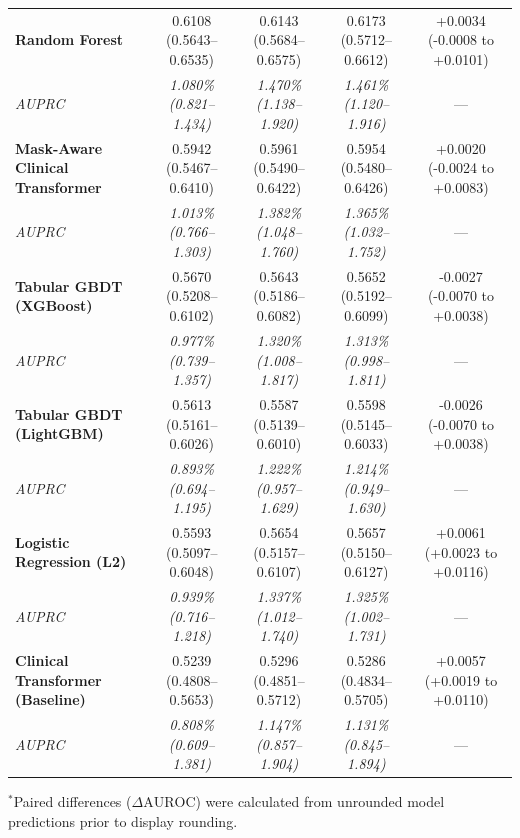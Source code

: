 \documentclass[12pt,a4paper]{article}
\begin{document}
\begin{landscape}
\begin{table}[p]
\begin{singlespace}
\begin{tabular*}{\linewidth}{@{\extracolsep{\fill}}l c c c c}
\textbf{Random Forest} & 0.6108 (0.5643--0.6535) & 0.6143 (0.5684--0.6575) & 0.6173 (0.5712--0.6612) & +0.0034 (-0.0008 to +0.0101) \\
\quad \textit{AUPRC} & \textit{1.080\% (0.821--1.434)} & \textit{1.470\% (1.138--1.920)} & \textit{1.461\% (1.120--1.916)} & --- \\[0.25em]
\textbf{Mask-Aware Clinical Transformer} & 0.5942 (0.5467--0.6410) & 0.5961 (0.5490--0.6422) & 0.5954 (0.5480--0.6426) & +0.0020 (-0.0024 to +0.0083) \\
\quad \textit{AUPRC} & \textit{1.013\% (0.766--1.303)} & \textit{1.382\% (1.048--1.760)} & \textit{1.365\% (1.032--1.752)} & --- \\[0.25em]
\textbf{Tabular GBDT (XGBoost)} & 0.5670 (0.5208--0.6102) & 0.5643 (0.5186--0.6082) & 0.5652 (0.5192--0.6099) & -0.0027 (-0.0070 to +0.0038) \\
\quad \textit{AUPRC} & \textit{0.977\% (0.739--1.357)} & \textit{1.320\% (1.008--1.817)} & \textit{1.313\% (0.998--1.811)} & --- \\[0.25em]
\textbf{Tabular GBDT (LightGBM)} & 0.5613 (0.5161--0.6026) & 0.5587 (0.5139--0.6010) & 0.5598 (0.5145--0.6033) & -0.0026 (-0.0070 to +0.0038) \\
\quad \textit{AUPRC} & \textit{0.893\% (0.694--1.195)} & \textit{1.222\% (0.957--1.629)} & \textit{1.214\% (0.949--1.630)} & --- \\[0.25em]
\textbf{Logistic Regression (L2)} & 0.5593 (0.5097--0.6048) & 0.5654 (0.5157--0.6107) & 0.5657 (0.5150--0.6127) & +0.0061 (+0.0023 to +0.0116) \\
\quad \textit{AUPRC} & \textit{0.939\% (0.716--1.218)} & \textit{1.337\% (1.012--1.740)} & \textit{1.325\% (1.002--1.731)} & --- \\[0.25em]
\textbf{Clinical Transformer (Baseline)} & 0.5239 (0.4808--0.5653) & 0.5296 (0.4851--0.5712) & 0.5286 (0.4834--0.5705) & +0.0057 (+0.0019 to +0.0110) \\
\quad \textit{AUPRC} & \textit{0.808\% (0.609--1.381)} & \textit{1.147\% (0.857--1.904)} & \textit{1.131\% (0.845--1.894)} & --- \\
\bottomrule
\end{tabular*}
\vspace{0.4em}
\raggedright
\fontsize{7.8pt}{9.8pt}\selectfont
$^*$Paired differences ($\Delta\mathrm{AUROC}$) were calculated from unrounded model predictions prior to display rounding.
\end{singlespace}
\end{table}
\end{landscape}
\end{document}
